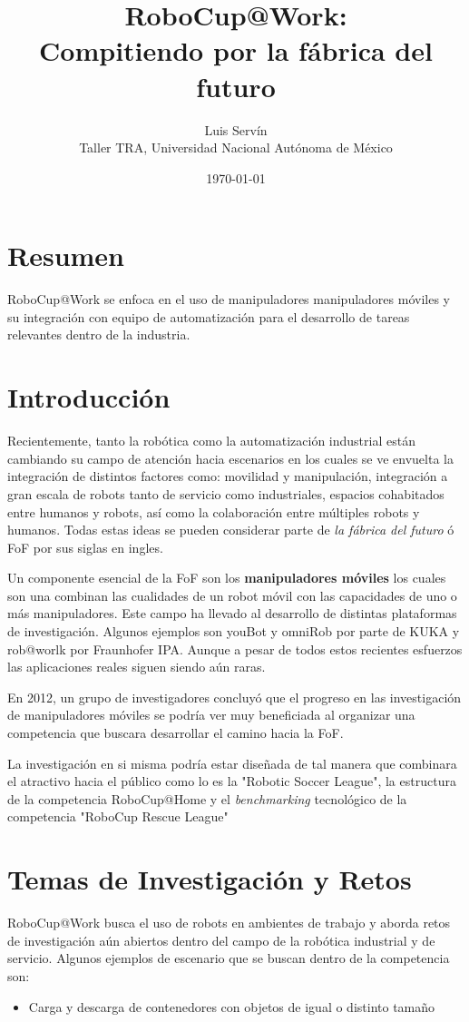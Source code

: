 \documentclass[12pt]{article}
\title{\vspace{-2ex}RoboCup@Work:\\Compitiendo por la fábrica del futuro\vspace{-2ex}}
\date{\today}
\author{Luis Servín\\ Taller TRA, Universidad Nacional Autónoma de México}
\begin{document}
\maketitle

\section*{Resumen}

RoboCup@Work se enfoca en el uso de manipuladores manipuladores móviles y su integración con equipo de automatización para el desarrollo de tareas relevantes dentro de la industria.

\section{Introducción}

Recientemente, tanto la robótica como la automatización industrial están cambiando su campo de atención hacia escenarios en los cuales se ve envuelta la integración de distintos factores como: movilidad y manipulación, integración a gran escala de robots tanto de servicio como industriales, espacios cohabitados entre humanos y robots, así como la colaboración entre múltiples robots y humanos. Todas estas ideas se pueden considerar parte de \emph{la fábrica del futuro} ó FoF por sus siglas en ingles.

Un componente esencial de la FoF son los \textbf{manipuladores móviles} los cuales son una combinan las cualidades de un robot móvil con las capacidades de uno o más manipuladores. Este campo ha llevado al desarrollo de distintas plataformas de investigación. Algunos ejemplos son youBot \cite{bischoff2011kuka} y omniRob por parte de KUKA y rob@worlk por  Fraunhofer IPA. Aunque a pesar de todos estos recientes esfuerzos las aplicaciones reales siguen siendo aún raras.

En 2012, un grupo de investigadores concluyó que el progreso en las investigación de manipuladores móviles se podría ver muy beneficiada al organizar una competencia que buscara desarrollar el camino hacia la FoF.

La investigación en si misma podría estar diseñada de tal manera que combinara el atractivo hacia el público como lo es la "Robotic Soccer League", la estructura de la competencia RoboCup@Home y el \emph{benchmarking} tecnológico de la competencia "RoboCup Rescue League"

\section{Temas de Investigación y Retos}

RoboCup@Work busca el uso de robots en ambientes de trabajo y aborda retos de investigación aún abiertos dentro del campo de la robótica industrial y de servicio. Algunos ejemplos de escenario que se buscan dentro de la competencia son:

\begin{itemize}
	\item Carga y descarga de contenedores con objetos de igual o distinto tamaño
\end{itemize}



\end{document}
